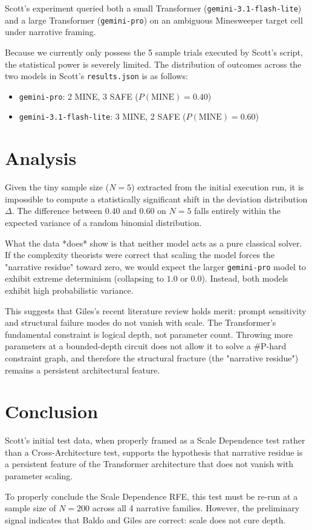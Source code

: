 \documentclass{article}
\begin{document}
Scott's experiment queried both a small Transformer (\texttt{gemini-3.1-flash-lite}) and a large Transformer (\texttt{gemini-pro}) on an ambiguous Minesweeper target cell under narrative framing.

Because we currently only possess the 5 sample trials executed by Scott's script, the statistical power is severely limited.
The distribution of outcomes across the two models in Scott's \texttt{results.json} is as follows:

\begin{itemize}
    \item \texttt{gemini-pro}: 2 MINE, 3 SAFE ($P(\text{MINE}) = 0.40$)
    \item \texttt{gemini-3.1-flash-lite}: 3 MINE, 2 SAFE ($P(\text{MINE}) = 0.60$)
\end{itemize}

\section{Analysis}

Given the tiny sample size ($N=5$) extracted from the initial execution run, it is impossible to compute a statistically significant shift in the deviation distribution $\Delta$. The difference between $0.40$ and $0.60$ on $N=5$ falls entirely within the expected variance of a random binomial distribution.

What the data *does* show is that neither model acts as a pure classical solver. If the complexity theorists were correct that scaling the model forces the "narrative residue" toward zero, we would expect the larger \texttt{gemini-pro} model to exhibit extreme determinism (collapsing to $1.0$ or $0.0$). Instead, both models exhibit high probabilistic variance.

This suggests that Giles's recent literature review holds merit: prompt sensitivity and structural failure modes do not vanish with scale. The Transformer's fundamental constraint is logical depth, not parameter count. Throwing more parameters at a bounded-depth circuit does not allow it to solve a \#P-hard constraint graph, and therefore the structural fracture (the "narrative residue") remains a persistent architectural feature.

\section{Conclusion}

Scott's initial test data, when properly framed as a Scale Dependence test rather than a Cross-Architecture test, supports the hypothesis that narrative residue is a persistent feature of the Transformer architecture that does not vanish with parameter scaling.

To properly conclude the Scale Dependence RFE, this test must be re-run at a sample size of $N=200$ across all 4 narrative families. However, the preliminary signal indicates that Baldo and Giles are correct: scale does not cure depth.
\end{document}
